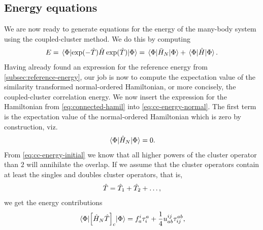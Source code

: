         \subsection{Energy equations}
            \label{subsec:cc-energy-equations}
            We are now ready to generate equations for the energy of the
            many-body system using the coupled-cluster method.
            We do this by computing
            \begin{align}
                \energy
                =
                \mel*{\slat}{
                    \exponential(-\clust)
                    \hamil
                    \exponential(\clust)
                }{\slat}
                = \mel*{\slat}{\simhamil_N}{\slat}
                + \mel*{\slat}{\hamil}{\slat}.
                \label{eq:cc-energy-normal}
            \end{align}
            Having already found an expression for the reference energy from
            \autoref{subsec:reference-energy}, our job is now to compute the
            expectation value of the similarity transformed normal-ordered
            Hamiltonian, or more concisely, the coupled-cluster correlation
            energy.
            We now insert the expression for the Hamiltonian from
            \autoref{eq:connected-hamil} into \autoref{eq:cc-energy-normal}.
            The first term is the expectation value of the normal-ordered
            Hamiltonian which is zero by construction, viz.
            \begin{align}
                \mel*{\Phi}{\hat{H}_N}{\Phi} = 0.
            \end{align}
            From \autoref{eq:cc-energy-initial} we know that all higher powers of
            the cluster operator than $2$ will annihilate the overlap.
            If we assume that the cluster operators contain at least the
            singles and doubles cluster operators, that is,
            \begin{align}
                \hat{T} = \hat{T}_1 + \hat{T}_2 + \dots,
            \end{align}
            we get the energy contributions
            \begin{align}
                \mel*{\Phi}{
                    \left[ 
                        \hat{H}_N \hat{T}
                     \right]_c
                }{\Phi}
                =
                f^{i}_{a}\tau^{a}_{i}
                +
                \frac{1}{4}u^{ij}_{ab} \tau^{ab}_{ij},
                \label{eq:cc-energy-linear-contrib}
            \end{align}
